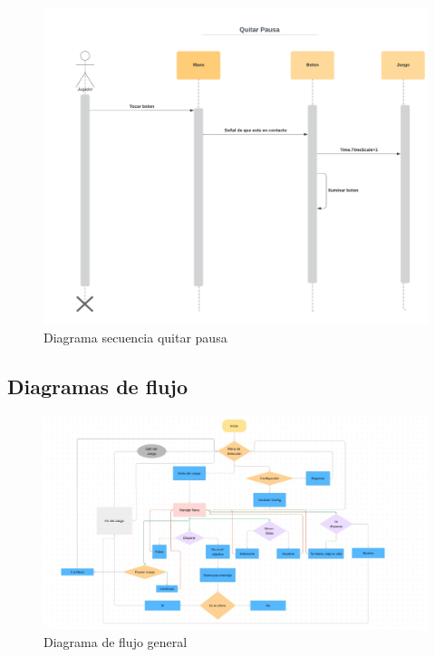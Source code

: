 \documentclass[12pt]{article} %
\begin{document}
\begin{figure}  [!htb]
  \includegraphics[width=\linewidth]{Diagrama secuencia play.png}
  \caption{Diagrama secuencia quitar pausa}
\end{figure}
\FloatBarrier


\subsection{Diagramas de flujo}
\begin{figure}  [!htb]
  \includegraphics[width=\linewidth]{flujomain.jpg}
  \caption{Diagrama de flujo general}
\end{figure}
\end{document}
